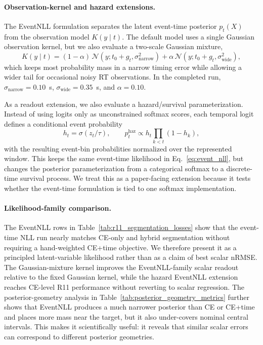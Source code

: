 \documentclass[12pt]{article}
\begin{document}
\paragraph{Observation-kernel and hazard extensions.}
The EventNLL formulation separates the latent event-time posterior $p_t(X)$ from the observation model $K(y\mid t)$. The default model uses a single Gaussian observation kernel, but we also evaluate a two-scale Gaussian mixture,
\begin{equation}
\label{eq:event_nll_mixture_kernel}
K(y\mid t)=(1-\alpha)\,\mathcal{N}(y;t_0+g_t,\sigma_{\mathrm{narrow}}^2)
+\alpha\,\mathcal{N}(y;t_0+g_t,\sigma_{\mathrm{wide}}^2),
\end{equation}
which keeps most probability mass in a narrow timing error while allowing a wider tail for occasional noisy RT observations. In the completed run, $\sigma_{\mathrm{narrow}}=0.10$~s, $\sigma_{\mathrm{wide}}=0.35$~s, and $\alpha=0.10$.

As a readout extension, we also evaluate a hazard/survival parameterization. Instead of using logits only as unconstrained softmax scores, each temporal logit defines a conditional event probability
\begin{equation}
\label{eq:hazard_readout}
h_t=\sigma(z_t/\tau),\qquad
p_t^{\mathrm{haz}} \propto h_t\prod_{k<t}(1-h_k),
\end{equation}
with the resulting event-bin probabilities normalized over the represented window. This keeps the same event-time likelihood in Eq.~\ref{eq:event_nll}, but changes the posterior parameterization from a categorical softmax to a discrete-time survival process. We treat this as a paper-facing extension because it tests whether the event-time formulation is tied to one softmax implementation.

\paragraph{Likelihood-family comparison.}
The EventNLL rows in Table~\ref{tab:r11_segmentation_losses} show that the event-time NLL run nearly matches CE-only and hybrid segmentation without requiring a hand-weighted CE+time objective. We therefore present it as a principled latent-variable likelihood rather than as a claim of best scalar nRMSE. The Gaussian-mixture kernel improves the EventNLL-family scalar readout relative to the fixed Gaussian kernel, while the hazard EventNLL extension reaches CE-level R11 performance without reverting to scalar regression. The posterior-geometry analysis in Table~\ref{tab:posterior_geometry_metrics} further shows that EventNLL produces a much narrower posterior than CE or CE+time and places more mass near the target, but it also under-covers nominal central intervals. This makes it scientifically useful: it reveals that similar scalar errors can correspond to different posterior geometries.
\end{document}

